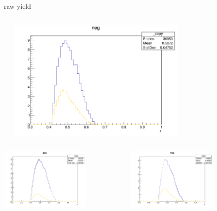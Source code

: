 \begin{frame}{raw yield}
\begin{columns}
\begin{column}[T]{0.25\textwidth}
\end{column}
\begin{column}[T]{0.25\textwidth}
\includegraphics[width = 0.7\textwidth]{results/yield/statistics/yield_x_Q2_z_0.50_5.000_0.50_neg.png}
\end{column}
\end{columns}
\begin{columns}
\begin{column}[T]{0.25\textwidth}
\includegraphics[width = 0.7\textwidth]{results/yield/statistics/yield_x_Q2_z_0.50_5.000_0.60_pos.png}
\end{column}
\begin{column}[T]{0.25\textwidth}
\includegraphics[width = 0.7\textwidth]{results/yield/statistics/yield_x_Q2_z_0.50_5.000_0.60_neg.png}

\end{column}
\end{columns}
\end{frame}
